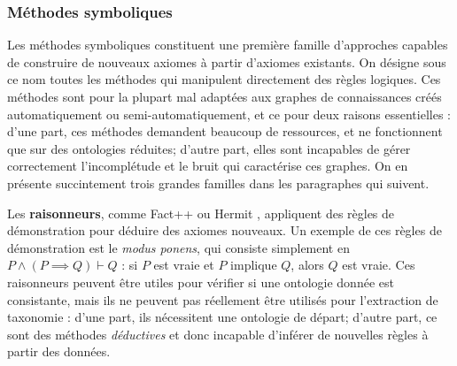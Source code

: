 \subsubsection{Méthodes symboliques}

Les méthodes symboliques constituent une première famille d'approches capables de construire de nouveaux axiomes à partir d'axiomes existants. On désigne sous ce nom toutes les méthodes qui manipulent directement des règles logiques.
Ces méthodes sont pour la plupart mal adaptées aux graphes de connaissances créés automatiquement ou semi-automatiquement, et ce pour deux raisons essentielles : d'une part, ces méthodes demandent beaucoup de ressources, et ne fonctionnent que sur des ontologies réduites; d'autre part, elles sont incapables de gérer correctement l'incomplétude et le bruit qui caractérise ces graphes.  On en présente succintement trois grandes familles dans les paragraphes qui suivent.

Les \textbf{raisonneurs}, comme Fact++ \cite{tsarkov2006fact++} ou Hermit \cite{glimm2014hermit}, appliquent des règles de démonstration pour déduire des axiomes nouveaux. Un exemple de ces règles de démonstration est le \textit{modus ponens}, qui consiste simplement en $P \land (P \implies Q) \vdash Q$ : si $P$ est vraie et $P$ implique $Q$, alors $Q$ est vraie. Ces raisonneurs peuvent être utiles pour vérifier si une ontologie donnée est consistante, mais ils ne peuvent pas réellement être utilisés pour l'extraction de taxonomie : 
d'une part, ils nécessitent une ontologie de départ; d'autre part, ce sont des méthodes \textit{déductives} et donc incapable d'inférer de nouvelles règles à partir des données. %

